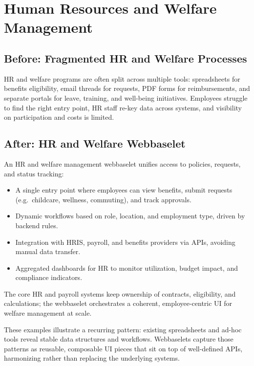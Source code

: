 \section{Human Resources and Welfare Management}

\subsection*{Before: Fragmented HR and Welfare Processes}
HR and welfare programs are often split across multiple tools:
spreadsheets for benefits eligibility, email threads for requests,
PDF forms for reimbursements, and separate portals for leave,
training, and well-being initiatives. Employees struggle to find
the right entry point, HR staff re-key data across systems, and
visibility on participation and costs is limited.

\subsection*{After: HR and Welfare Webbaselet}
An HR and welfare management webbaselet unifies access to policies,
requests, and status tracking:
\begin{itemize}
  \item A single entry point where employees can view benefits,
        submit requests (e.g.\ childcare, wellness, commuting),
        and track approvals.
  \item Dynamic workflows based on role, location, and employment
        type, driven by backend rules.
  \item Integration with HRIS, payroll, and benefits providers via
        APIs, avoiding manual data transfer.
  \item Aggregated dashboards for HR to monitor utilization,
        budget impact, and compliance indicators.
\end{itemize}
The core HR and payroll systems keep ownership of contracts,
eligibility, and calculations; the webbaselet orchestrates a
coherent, employee-centric UI for welfare management at scale.

\bigskip
These examples illustrate a recurring pattern: existing spreadsheets
and ad-hoc tools reveal stable data structures and workflows.
Webbaselets capture those patterns as reusable, composable UI pieces
that sit on top of well-defined APIs, harmonizing rather than
replacing the underlying systems.